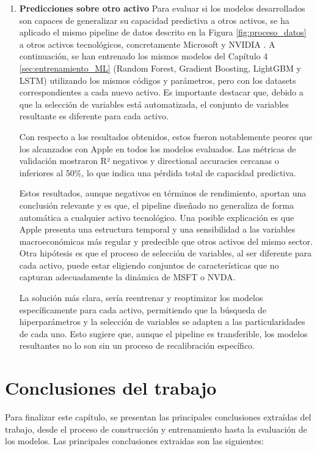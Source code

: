 \begin{enumerate}
        Por otro lado, este experimento no se ha realizado sobre LSTM, ya que el análisis SHAP no se aplicó a este modelo al tratarse de una caja negra.

        \item \textbf{Predicciones sobre otro activo}
        Para evaluar si los modelos desarrollados son capaces de generalizar su capacidad predictiva a otros activos, se ha aplicado el mismo pipeline de datos descrito en la Figura \ref{fig:proceso_datos} a otros activos tecnológicos, concretamente Microsoft \cite{microsoft} y NVIDIA \cite{nvidia}. A continuación, se han entrenado los mismos modelos del Capítulo 4 \ref{sec:entrenamiento_ML} (Random Forest, Gradient Boosting, LightGBM y LSTM) utilizando los mismos códigos y parámetros, pero con los datasets correspondientes a cada nuevo activo. Es importante destacar que, debido a que la selección de variables está automatizada, el conjunto de variables resultante es diferente para cada activo.

        Con respecto a los resultados obtenidos, estos fueron notablemente peores que los alcanzados con Apple en todos los modelos evaluados. Las métricas de validación mostraron R² negativos y directional accuracies cercanas o inferiores al 50\%, lo que indica una pérdida total de capacidad predictiva.

        Estos resultados, aunque negativos en términos de rendimiento, aportan una conclusión relevante y es que, el pipeline diseñado no generaliza de forma automática a cualquier activo tecnológico. Una posible explicación es que Apple presenta una estructura temporal y una sensibilidad a las variables macroeconómicas más regular y predecible que otros activos del mismo sector. Otra hipótesis es que el proceso de selección de variables, al ser diferente para cada activo, puede estar eligiendo conjuntos de características que no capturan adecuadamente la dinámica de MSFT o NVDA.

        La solución más clara, sería reentrenar y reoptimizar los modelos específicamente para cada activo, permitiendo que la búsqueda de hiperparámetros y la selección de variables se adapten a las particularidades de cada uno. Esto sugiere que, aunque el pipeline es transferible, los modelos resultantes no lo son sin un proceso de recalibración específico.

    \end{enumerate}

\section{Conclusiones del trabajo}
Para finalizar este capítulo, se presentan las principales conclusiones extraídas del trabajo, desde el proceso de construcción y entrenamiento hasta la evaluación de los modelos. Las principales conclusiones extraidas son las siguientes:

